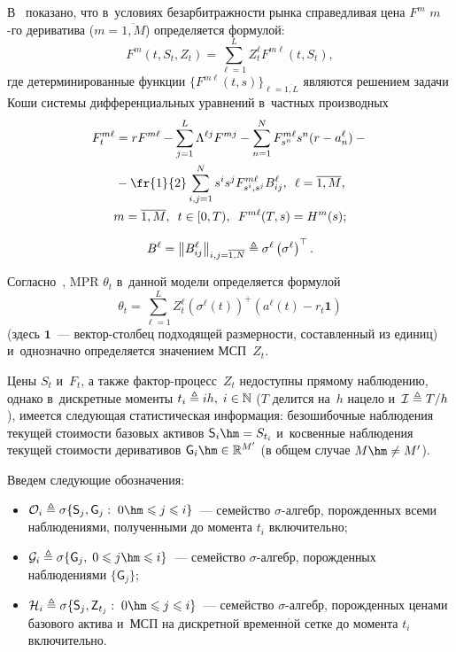 \begin{multicols}{2}
В~\cite{B_23_1_IA} показано, что в~условиях безарбит\-раж\-ности рынка  справедливая 
цена $F^m$ $m$-го дериватива ($m=\overline{1,M}$) определяется формулой:
$$
F^m (t, S_t, Z_t) = \sum\limits_{\ell=1}^L Z_t^{\ell} F^{m\ell} (t, S_t),
$$
где детерминированные функции $\{F^{m\ell} (t, s)\}_{\ell = \overline{1,L}}$ 
являются решением задачи Коши  системы дифференциальных уравнений в~частных 
производных
\begin{multline}
F_t^{m\ell} = rF^{m\ell} - \displaystyle\sum\limits_{j=1}^L \Lambda^{\ell j}F^{mj} - \sum\limits_{n=1}^N 
F_{s^n}^{m\ell}s^n(r-a_n^{\ell} ) -{}\\
{}- 
\fr{1}{2}  \sum\limits_{i,j=1}^N s^is^j F_{s^i,s^j}^{m\ell}B_{ij}^{\ell},\enskip
\ell=\overline{1,M}, \\
 m=\overline{1,M}, \enskip
t \in [0,T), \enskip
F^{m\ell}(T,s) = H^m(s);
\label{eq:F_m_eq}
\end{multline}

\noindent
$$
B^{\ell} = \left\|B_{ij}^{\ell}\right\|_{i,j=\overline{1,N}} \triangleq 
\sigma^{\ell}\left( \sigma^{\ell} \right)^{\top}.
$$

Согласно~\cite{B_23_1_IA}, MPR $\theta_t$ в~данной модели определяется формулой
$$
\theta_t = \sum\limits_{\ell=1}^L Z_t^{\ell} \left(\sigma^{\ell}(t)\right)^+ \left( 
a^{\ell}(t) - r_t \mathbf{1} \right)
$$
(здесь $\mathbf{1}$~--- вектор-стол\-бец подходящей раз\-мер\-ности, составленный из 
единиц) и~однозначно определяется значением МСП~$Z_t$.

Цены $S_t$ и~$F_t$, а также фак\-тор-про\-цесс~$Z_t$ недоступны прямому наблюдению, 
однако в~дискретные моменты $t_i \triangleq i h,\; i \in \mathbb{N}$ ($T$ делится на~$h$ 
нацело и~$\mathcal{I} \triangleq T/h$), имеется следующая статистическая 
информация:
безошибочные наблюдения текущей стоимости базовых активов
$
\mathsf{S}_i \hm= S_{t_i}$ и~косвенные наблюдения текущей стоимости деривативов $\mathsf{G}_i \hm\in 
\mathbb{R}^{M'}$ (в общем случае $M \hm\neq M'$).

Введем следующие обозначения:
\begin{itemize}
\item
$\mathcal{O}_i \ebd \sigma \{\mathsf{S}_j , \mathsf{G}_j: \; 0 \hm\leqslant j 
\leqslant i\}$~--- семейство \mbox{$\sigma$-ал}\-гебр, порожденных всеми наблюдениями, 
полученными до момента  $t_i$ включительно;\\[-14pt]
\item
$\mathcal{G}_i \ebd \sigma \{\mathsf{G}_j, \; 0 \leqslant j \hm\leqslant i\}$~--- 
семейство $\sigma$-алгебр, порожденных наблюдениями $\{\mathsf{G}_j\}$;\\[-14pt]
\item
$\mathcal{H}_i \ebd \sigma \{\mathsf{S}_j , \mathsf{Z}_{t_j}: \; 0\hm \leqslant j 
\leqslant i\}$~--- семейство \mbox{$\sigma$-ал}\-гебр, порожденных ценами базового актива и~МСП на дискретной временн$\acute{\mbox{о}}$й сетке до момента $t_i$ включительно.
\end{itemize}


\end{multicols}
